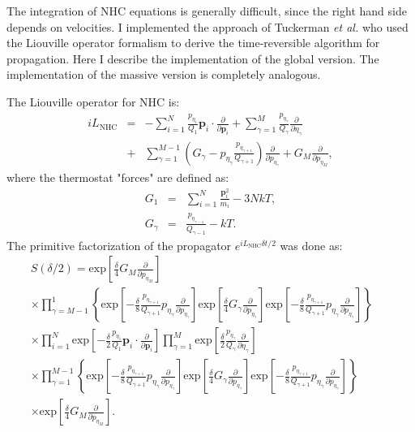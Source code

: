 The integration of NHC equations is generally difficult, since the right hand side depends on velocities.
I implemented the approach of Tuckerman \textit{et al.} who used the Liouville operator formalism to derive the time-reversible algorithm for propagation\cite{Martyna1996}. Here I describe the implementation of the global version. The implementation of the massive version is completely analogous.

The Liouville operator for NHC is:
\begin{eqnarray}
iL_{\textrm{NHC}}&=&-\sum^N_{i=1}\frac{p_{\eta_1}}{Q_1}\mathbf{p}_i\cdot \frac{\partial}{\partial \mathbf{p}_i}+
\sum_{\gamma =1}^M\frac{p_{\eta_\gamma}}{Q_\gamma}\frac{\partial}{\partial \eta_\gamma} \\
&+&\sum_{\gamma=1}^{M-1}\left( G_\gamma-p_{\eta_\gamma}\frac{p_{\eta_{\gamma+1}}}{Q_{\gamma+1}}\right)\frac{\partial}{\partial p_{\eta_\gamma}}+G_M\frac{\partial}{\partial p_{\eta_M}} ,\nonumber
\end{eqnarray}
where the thermostat "forces" are defined as:
\begin{eqnarray}
G_1&=&\sum^N_{i=1}\frac{\mathbf{p}_i^2}{m_i}-3NkT   ,\\
G_\gamma &=&\frac{p_{\eta_{\gamma-1}}}{Q_{\gamma-1}}-kT\nonumber  .
\end{eqnarray}
The primitive factorization of the propagator $e^{iL_{\mathrm{NHC}}\delta t/2} $ was done as:
\begin{eqnarray}
S(\delta/2)=\mathrm{exp}\left[\frac{\delta}{4} G_M \frac{\partial}{\partial p_{\eta_M}} \right] &&\nonumber \\
\times \prod^{1}_{\gamma =M-1} \left\lbrace \mathrm{exp}\left[-\frac{\delta}{8}  \frac{p_{\eta_{\gamma+1}}}{Q_{\gamma+1}}
p_{\eta_\gamma}\frac{\partial}{\partial p_{\eta_\gamma}} \right]
\mathrm{exp}\left[\frac{\delta}{4}G_\gamma\frac{\partial}{\partial p_{\eta_\gamma}} \right]
\mathrm{exp}\left[-\frac{\delta}{8}\frac{p_{\eta_{\gamma+1}}}{Q_{\gamma+1}}
p_{\eta_\gamma}\frac{\partial}{\partial p_{\eta_\gamma}} \right] \right\rbrace & & \nonumber\\
\times  \prod^N_{i=1} 
\mathrm{exp}\left[-\frac{\delta}{2}\frac{p_{\eta_1}}{Q_1}\mathbf{p}_i\cdot\frac{\partial}{\partial \mathbf{p}_i} \right]
\prod^M_{\gamma=1} \mathrm{exp}\left[\frac{\delta}{2}\frac{p_{\eta_\gamma}}{Q_\gamma}\frac{\partial}{\partial \eta_\gamma} \right]& &  \nonumber \\
\times  \prod^{M-1}_{\gamma =1} \left\lbrace \mathrm{exp}\left[-\frac{\delta}{8}\frac{p_{\eta_{\gamma+1}}}{Q_{\gamma+1}}
p_{\eta_\gamma}\frac{\partial}{\partial p_{\eta_\gamma}} \right] 
\mathrm{exp}\left[\frac{\delta}{4}G_\gamma\frac{\partial}{\partial p_{\eta_\gamma}} \right]
\mathrm{exp}\left[-\frac{\delta}{8}\frac{p_{\eta_{\gamma+1}}}{Q_{\gamma+1}}
p_{\eta_\gamma}\frac{\partial}{\partial p_{\eta_\gamma}} \right] \right\rbrace &  & \nonumber \\
\times  \mathrm{exp}\left[\frac{\delta}{4} G_M \frac{\partial}{\partial p_{\eta_M}} \right]  .& &
\label{eqprimfac}
\end{eqnarray}

